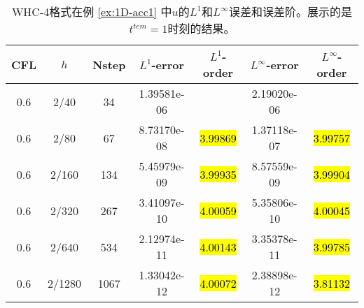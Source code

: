 \def\titleintable{CFL&$h$&Nstep&$L^1$-error&$L^1$-order&$L^\infty$-error&$L^\infty$-order\\}

\begin{table}[htbp]
	\caption{WHC-4格式在例 \ref{ex:1D-acc1} 中$u$的$L^1$和$L^\infty$误差和误差阶。展示的是$t^{tem} = 1$时刻的结果。}
	\label{ta:1D-ex1-WHC4}
	\centering
	\begin{tabular}{ccccccc}
		\toprule
		\titleintable
		\midrule
		0.6 & 2/40   & 34   & 1.39581e-06 &              & 2.19020e-06 &              \\
		0.6 & 2/80   & 67   & 8.73170e-08 & \hl{3.99869} & 1.37118e-07 & \hl{3.99757} \\
		0.6 & 2/160  & 134  & 5.45979e-09 & \hl{3.99935} & 8.57559e-09 & \hl{3.99904} \\
		0.6 & 2/320  & 267  & 3.41097e-10 & \hl{4.00059} & 5.35806e-10 & \hl{4.00045} \\
		0.6 & 2/640  & 534  & 2.12974e-11 & \hl{4.00143} & 3.35378e-11 & \hl{3.99785} \\
		0.6 & 2/1280 & 1067 & 1.33042e-12 & \hl{4.00072} & 2.38898e-12 & \hl{3.81132} \\
		\bottomrule
	\end{tabular}
\end{table}

